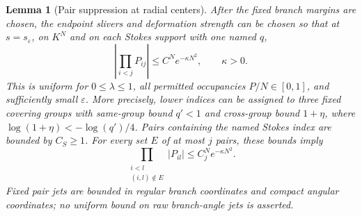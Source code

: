 \documentclass[11pt]{article}
\numberwithin{equation}{section}
\newtheorem{lemma}[theorem]{Lemma}
\theoremstyle{definition}
\newcommand{\eps}{\varepsilon}
\begin{document}
\begin{lemma}[Pair suppression at radial centers]\label{lem:contraction}
After the fixed branch margins are chosen, the endpoint slivers and
deformation strength can be chosen so that at \(s=s_\eps\), on
\(K^N\) and on each Stokes support with one named \(q\),
\[
 \left|\prod_{i<j}P_{ij}\right|\le C^Ne^{-\kappa N^2},
 \qquad \kappa>0 .
\]
This is uniform for \(0\le\lambda\le1\), all permitted occupancies
\(P/N\in[0,1]\), and sufficiently small \(\eps\).
More precisely, lower indices can be assigned to three fixed
covering groups with same-group bound \(q'<1\) and cross-group
bound \(1+\eta\), where \(\log(1+\eta)<-\log(q')/4\).
Pairs containing the named Stokes index are bounded by \(C_S\ge1\).
For every set \(E\) of at most \(j\) pairs, these bounds imply
\[
 \prod_{\substack{i<l\\(i,l)\notin E}}|P_{il}|
       \le C_j^N e^{-\kappa N^2}.
\]
Fixed pair jets are bounded in regular branch coordinates and
compact angular coordinates; no uniform bound on raw branch-angle
jets is asserted.
\end{lemma}
\end{document}
